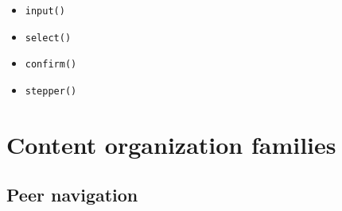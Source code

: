 \begin{itemize}
  \begin{itemize}
  \tightlist
  \item
    \texttt{i\allowbreak{}n\allowbreak{}p\allowbreak{}u\allowbreak{}t\allowbreak{}(\allowbreak{})}
  \item
    \texttt{s\allowbreak{}e\allowbreak{}l\allowbreak{}e\allowbreak{}c\allowbreak{}t\allowbreak{}(\allowbreak{})}
  \item
    \texttt{c\allowbreak{}o\allowbreak{}n\allowbreak{}f\allowbreak{}i\allowbreak{}r\allowbreak{}m\allowbreak{}(\allowbreak{})}
  \item
    \texttt{s\allowbreak{}t\allowbreak{}e\allowbreak{}p\allowbreak{}p\allowbreak{}e\allowbreak{}r\allowbreak{}(\allowbreak{})}
  \end{itemize}
\end{itemize}

\section{Content organization families}\label{record-019-content-organization-families}

\subsection{Peer navigation}\label{record-019-peer-navigation}

